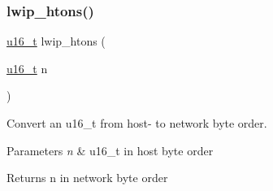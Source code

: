 \subsubsection{\texorpdfstring{lwip\+\_\+htons()}{lwip\_htons()}}
{\footnotesize\ttfamily \hyperlink{group__compiler__abstraction_ga77570ac4fcab86864fa1916e55676da2}{u16\+\_\+t} lwip\+\_\+htons (\begin{DoxyParamCaption}\item[{\hyperlink{group__compiler__abstraction_ga77570ac4fcab86864fa1916e55676da2}{u16\+\_\+t}}]{n }\end{DoxyParamCaption})}

Convert an u16\+\_\+t from host-\/ to network byte order.


\begin{DoxyParams}{Parameters}
{\em n} & u16\+\_\+t in host byte order \\
\hline
\end{DoxyParams}
\begin{DoxyReturn}{Returns}
n in network byte order 
\end{DoxyReturn}
